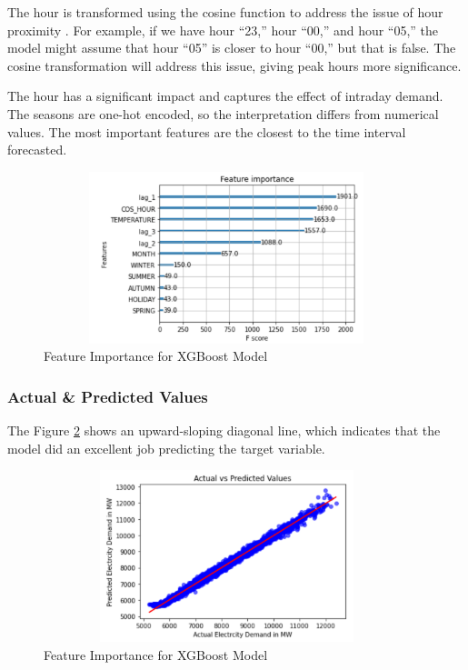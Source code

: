 \documentclass[mstat,12pt]{unswthesis}
\begin{document}
The hour is transformed using the cosine function to address the issue
of hour proximity \cite{avanwyk_2022_encoding}. For example, if we have
hour ``23,'' hour ``00,'' and hour ``05,'' the model might assume that
hour ``05'' is closer to hour ``00,'' but that is false. The cosine
transformation will address this issue, giving peak hours more
significance.

The hour has a significant impact and captures the effect of intraday
demand. The seasons are one-hot encoded, so the interpretation differs
from numerical values. The most important features are the closest to
the time interval forecasted.

\begin{figure}[H]
\centering
\includegraphics[width=0.95\textwidth, height=5cm]{featureimp.png}
\caption{Feature Importance for XGBoost Model}\label{featureimp}
\end{figure}

\subsubsection{Actual \& Predicted
Values}\label{actual-predicted-values}

The Figure \ref{actualpredict} shows an upward-sloping diagonal line,
which indicates that the model did an excellent job predicting the
target variable.

\begin{figure}[H]
\centering
\includegraphics[width=0.95\textwidth, height=5cm]{actualpredict.png}
\caption{Feature Importance for XGBoost Model}\label{actualpredict}
\end{figure}
\end{document}
